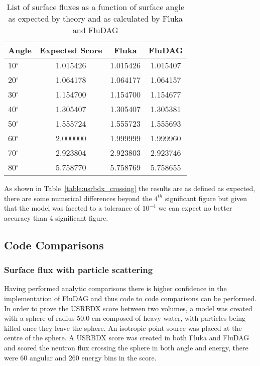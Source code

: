 \documentclass{anstrans}[11pt]
\begin{document}
\begin{table}[h!]
        \begin{center}
                \begin{tabular}{|l|c|c|c|}
                  \hline
                        Angle & Expected Score & Fluka  & FluDAG \\
                        \hline
                        10$^{\circ}$ & 1.015426 & 1.015426 & 1.015407\\
                        20$^{\circ}$ & 1.064178 & 1.064177 & 1.064157\\
                        30$^{\circ}$ & 1.154700 & 1.154700 & 1.154677\\
                        40$^{\circ}$ & 1.305407 & 1.305407 & 1.305381\\
                        50$^{\circ}$ & 1.555724 & 1.555723 & 1.555693\\
                        60$^{\circ}$ & 2.000000 & 1.999999 & 1.999960\\
                        70$^{\circ}$ & 2.923804 & 2.923803 & 2.923746\\
                        80$^{\circ}$ & 5.758770 & 5.758769 & 5.758655\\
                        \hline
                \end{tabular}
                \caption{List of surface fluxes as a function of surface
                         angle as expected by theory and as calculated by 
                         Fluka and FluDAG}
                \label{usrbdx_crossing}
                \end{center}
\end{table}

As shown in Table~\ref{table:usrbdx_crossing} the results are as defined as expected, 
there are some numerical differences beyond the $4^{th}$ significant figure but given that the model
was faceted to a tolerance of $10^{-4}$ we can expect no better accuracy 
than 4 significant figure.

\subsection{Code Comparisons}
\subsubsection*{Surface flux with particle scattering}
Having performed analytic comparisons there is higher confidence in
the implementation of FluDAG and thus code to code comparisons can be
performed. In order to prove the USRBDX score between two volumes, a
model was created with a sphere of radius 50.0 cm composed of heavy
water, with particles being killed once they leave the sphere. An
isotropic point source was placed at the centre of the sphere. A
USRBDX score was created in both Fluka and FluDAG and scored the
neutron flux crossing the sphere in both angle and energy, there were
60 angular and 260 energy bins in the score.
\end{document}
